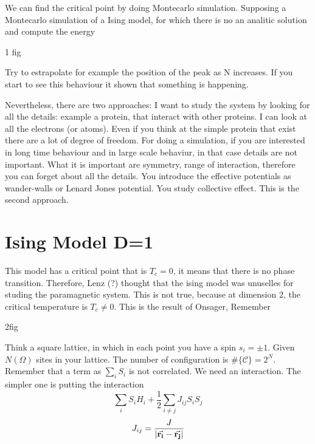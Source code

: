 \documentclass[../main/main.tex]{subfiles}
\begin{document}
We can find the critical point by doing Montecarlo simulation. Supposing a Montecarlo simulation of a Ising model, for which there is no an analitic solution and compute the energy

1 fig

Try to estrapolate for example the position of the peak as N increases. If you start to see this behaviour it shown that something is happening.

Nevertheless, there are two approaches:
 I want to study the system by looking for all the details: example a protein, that interact with other proteins. I can look at all the electrons (or atoms). Even if you think at the simple protein that exist there are a lot of degree of freedom. For doing a simulation, if you are interested in long time behaviour and in large scale behaviur, in that case details are not important. What it is important are symmetry, range of interaction, therefore you can forget about all the details. You introduce the effective potentials as wander-walls or Lenard Jones potential. You study collective effect. This is the second approach.

\section{Ising Model D=1}
This model has a critical point that is \( T_c = 0 \), it means that there is no phase transition. Therefore, Lenz (?) thought that the ising model was unuselles for studing the paramagnetic system. This is not true, because at dimension 2, the critical temperature is
\( T_c \neq 0 \). This is the result of Onsager,
Remember

2fig

Think a square lattice, in which in each point you have a spin \( s_i = \pm 1 \). Given \( N(\Omega ) \) sites in your lattice. The number of configuration is \( \# \{\mathcal{C} \}=2^N \). Remember that a term as \( \sum_{i}^{} S_i  \) is not correlated. We need an interaction. The simpler one is putting the interaction
\begin{equation}
   \sum_{i}^{} S_i H_i +  \frac{1}{2}\sum_{i \neq j}^{}  J_{ij} S_i S_j
\end{equation}
\begin{equation}
  J_{ij} = \frac{J}{\abs{\va{r_i} -\va{r_j  } } }
\end{equation}
\end{document}
